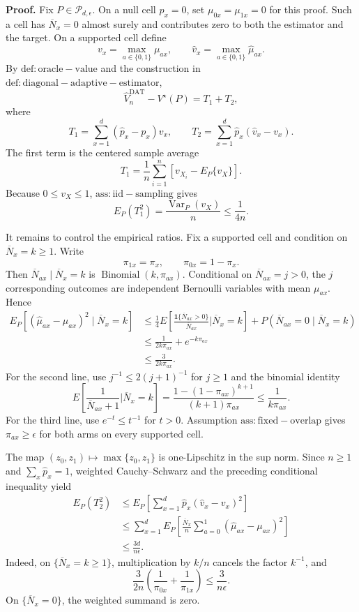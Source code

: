 \textbf{Proof.}
Fix \(P\in\mathcal P_{d,\epsilon}\).  On a null cell \(p_x=0\), set \(\mu_{0x}=\mu_{1x}=0\) for this proof.  Such a cell has \(\overline N_x=0\) almost surely and contributes zero to both the estimator and the target.  On a supported cell define
\[
 v_x=\max_{a\in\{0,1\}}\mu_{ax},
 \qquad
 \widehat v_x=\max_{a\in\{0,1\}}\widehat\mu_{ax}.
\]
By \(\mathrm{def:oracle-value}\) and the construction in \(\mathrm{def:diagonal-adaptive-estimator}\),
\[
 \widehat V_n^{\mathrm{DAT}}-V^\star(P)=T_1+T_2,
\]
where
\[
 T_1=\sum_{x=1}^d(\widehat p_x-p_x)v_x,
 \qquad
 T_2=\sum_{x=1}^d\widehat p_x(\widehat v_x-v_x).
\]
The first term is the centered sample average
\[
 T_1=\frac1n\sum_{i=1}^n
 \left[v_{X_i}-E_P\{v_X\}\right].
\]
Because \(0\le v_X\le1\), \(\mathrm{ass:iid-sampling}\) gives
\[
 E_P(T_1^2)=\frac{\operatorname{Var}_P(v_X)}n\le\frac1{4n}.
\]

It remains to control the empirical ratios.  Fix a supported cell and condition on \(\overline N_x=k\ge1\).  Write
\[
 \pi_{1x}=\pi_x,
 \qquad
 \pi_{0x}=1-\pi_x.
\]
Then \(\overline N_{ax}\mid\overline N_x=k\) is \(\operatorname{Binomial}(k,\pi_{ax})\).  Conditional on \(\overline N_{ax}=j>0\), the \(j\) corresponding outcomes are independent Bernoulli variables with mean \(\mu_{ax}\).  Hence
\[
 \begin{aligned}
 E_P\!\left[
   (\widehat\mu_{ax}-\mu_{ax})^2
   \mid \overline N_x=k
 \right]
 &\le \frac14 E\!\left[
    \frac{\mathbf 1\{\overline N_{ax}>0\}}{\overline N_{ax}}
    \mathrel{\Big|}\overline N_x=k
  \right]
  +P(\overline N_{ax}=0\mid\overline N_x=k)\\
 &\le \frac1{2k\pi_{ax}}+e^{-k\pi_{ax}}\\
 &\le \frac3{2k\pi_{ax}}.
 \end{aligned}
\]
For the second line, use \(j^{-1}\le2(j+1)^{-1}\) for \(j\ge1\) and the binomial identity
\[
 E\!\left[
   \frac1{\overline N_{ax}+1}
   \mathrel{\Big|}\overline N_x=k
 \right]
 =\frac{1-(1-\pi_{ax})^{k+1}}{(k+1)\pi_{ax}}
 \le\frac1{k\pi_{ax}}.
\]
For the third line, use \(e^{-t}\le t^{-1}\) for \(t>0\).  Assumption \(\mathrm{ass:fixed-overlap}\) gives \(\pi_{ax}\ge\epsilon\) for both arms on every supported cell.

The map \((z_0,z_1)\mapsto\max\{z_0,z_1\}\) is one-Lipschitz in the sup norm.  Since \(n\ge1\) and \(\sum_x\widehat p_x=1\), weighted Cauchy--Schwarz and the preceding conditional inequality yield
\[
 \begin{aligned}
 E_P(T_2^2)
 &\le E_P\!\left[
   \sum_{x=1}^d\widehat p_x(\widehat v_x-v_x)^2
 \right]\\
 &\le \sum_{x=1}^d E_P\!\left[
   \frac{\overline N_x}{n}
   \sum_{a=0}^1(\widehat\mu_{ax}-\mu_{ax})^2
 \right]\\
 &\le \frac{3d}{n\epsilon}.
 \end{aligned}
\]
Indeed, on \(\{\overline N_x=k\ge1\}\), multiplication by \(k/n\) cancels the factor \(k^{-1}\), and
\[
 \frac3{2n}\left(\frac1{\pi_{0x}}+\frac1{\pi_{1x}}\right)
 \le\frac3{n\epsilon}.
\]
On \(\{\overline N_x=0\}\), the weighted summand is zero.

